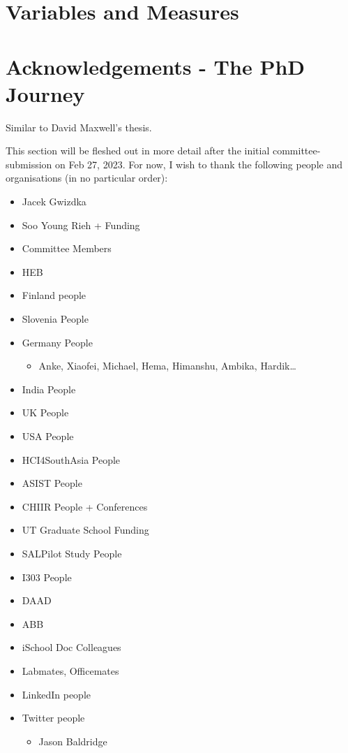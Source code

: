 \documentclass[letterpaper, nobind]{templates/ociamthesis}
\providecommand{\tightlist}{%
  \setlength{\itemsep}{0pt}\setlength{\parskip}{0pt}}
\begin{document}
\hypertarget{app_variables}{%
\chapter{Variables and Measures}\label{app_variables}}

\hypertarget{sec_app_ack}{%
\chapter{Acknowledgements - The PhD Journey}\label{sec_app_ack}}

Similar to David Maxwell's thesis.

This section will be fleshed out in more detail after the initial committee-submission on Feb 27, 2023.
For now, I wish to thank the following people and organisations (in no particular order):

\begin{itemize}
\tightlist
\item
  Jacek Gwizdka
\item
  Soo Young Rieh + Funding
\item
  Committee Members
\item
  HEB
\item
  Finland people
\item
  Slovenia People
\item
  Germany People

  \begin{itemize}
  \tightlist
  \item
    Anke, Xiaofei, Michael, Hema, Himanshu, Ambika, Hardik\ldots{}
  \end{itemize}
\item
  India People
\item
  UK People
\item
  USA People
\item
  HCI4SouthAsia People
\item
  ASIST People
\item
  CHIIR People + Conferences
\item
  UT Graduate School Funding
\item
  SALPilot Study People
\item
  I303 People
\item
  DAAD
\item
  ABB
\item
  iSchool Doc Colleagues
\item
  Labmates, Officemates
\item
  LinkedIn people
\item
  Twitter people

  \begin{itemize}
  \tightlist
  \item
    Jason Baldridge
  \end{itemize}
\end{itemize}
\end{document}
